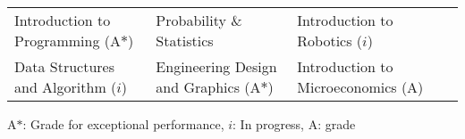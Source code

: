 
\begin{tabular*}{\textwidth}{l l l l}
  Introduction to Programming (A$*$) & Probability \& Statistics  & Introduction to Robotics ($i$) \\
  Data Structures and Algorithm ($i$) & Engineering Design and Graphics (A$*$)& Introduction to Microeconomics (A) \\
\end{tabular*}
{\footnotesize
    {A$*$: Grade for exceptional performance, $i$: In progress, A: grade}
}
